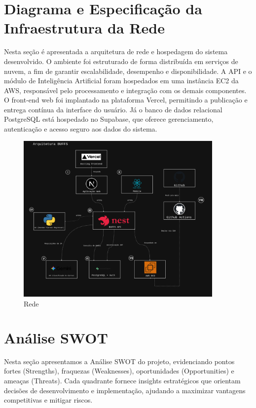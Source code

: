 \documentclass[
  a4paper,%
  12pt,%
  english,%
  brazilian,%
]{article}
\begin{document}
\newpage
\section*{Diagrama e Especificação da Infraestrutura da Rede}
Nesta seção é apresentada a arquitetura de rede e hospedagem do sistema desenvolvido. O ambiente foi estruturado de forma distribuída em serviços de nuvem, a fim de garantir escalabilidade, desempenho e disponibilidade. A API e o módulo de Inteligência Artificial foram hospedados em uma instância EC2 da AWS, responsável pelo processamento e integração com os demais componentes. O front-end web foi implantado na plataforma Vercel, permitindo a publicação e entrega contínua da interface do usuário. Já o banco de dados relacional PostgreSQL está hospedado no Supabase, que oferece gerenciamento, autenticação e acesso seguro aos dados do sistema.
     \begin{figure}[h]
\centering
\caption{Rede}%
\label{fig:rede}
\includegraphics[width=0.9\textwidth]{Logos/buffs-arch-model.png}
\end{figure}

\newpage
\section*{Análise SWOT}
Nesta seção apresentamos a Análise SWOT do projeto, evidenciando pontos fortes (Strengths), fraquezas (Weaknesses), oportunidades (Opportunities) e ameaças (Threats). Cada quadrante fornece insights estratégicos que orientam decisões de desenvolvimento e implementação, ajudando a maximizar vantagens competitivas e mitigar riscos.
\end{document}
